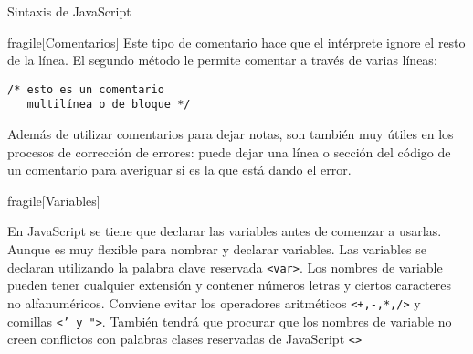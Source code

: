 \begin{frame}{Sintaxis de JavaScript}
\begin{frame}{fragile}[Comentarios]
    Este tipo de comentario hace que el intérprete ignore el resto de la línea.
    El segundo método le permite comentar a través de varias líneas:
   
   \begin{lstlisting}
/* esto es un comentario
   multilínea o de bloque */
    \end{lstlisting}

    Además de utilizar comentarios para dejar notas, son también muy útiles en
    los procesos de corrección de errores: puede dejar una línea o sección del
    código de un comentario para averiguar si es la que está dando el error.

\end{frame}

\begin{frame}{fragile}[Variables]
    
    En JavaScript se tiene que declarar las variables antes de comenzar a
    usarlas. Aunque es muy flexible para nombrar y declarar variables.
    Las variables se declaran utilizando la palabra clave reservada
    \texttt{<var>}. Los nombres de variable pueden tener cualquier extensión y
    contener números letras y ciertos caracteres no alfanuméricos. Conviene
    evitar los operadores aritméticos  \texttt{<+,-,*,/>} y comillas
    \texttt{<' y ">}. También tendrá que procurar que los nombres de variable
    no creen conflictos con palabras clases reservadas de JavaScript \texttt{<>} 


\end{frame}

\end{frame}



